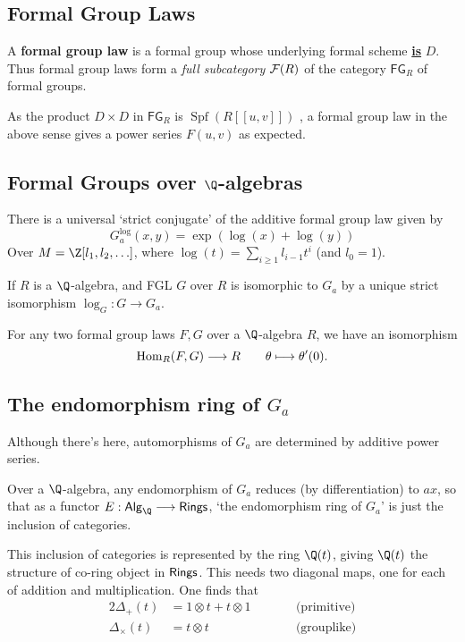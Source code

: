 \documentclass[11pt]{article}
\newcommand{\FGR}{\mathsf{FG}_R}
\newcommand{\FGLR}{\calF(R)}
\DeclareMathOperator{\SPf}{Spf}
\begin{document}
\subsection{Formal Group Laws}
\begin{itemise}
\setlength{\parindent}{.25in}
\item A \textbf{formal group law} is a formal group whose underlying formal scheme \textbf{\underline{is}} $D$. Thus formal group laws form a \emph{full subcategory} $\FGLR$ of the category $\FGR$ of formal groups.
\item As the product $D\times D$ in $\FGR$ is $\SPf(R[[u,v]])$ , a formal group law in the above sense gives a power series $F(u,v)$ as expected.
\end{itemise}
\subsection{Formal Groups over $\Q$-algebras}
\begin{itemise}
\setlength{\parindent}{.25in}
\item There is a universal `strict conjugate' of the additive formal group law given by
\[G_a^{\log}(x,y)=\exp(\log(x)+\log(y))\]
Over $M=\Z[l_1,l_2,\ldots]$, where $\log(t)=\sum_{i\geq1}l_{i-1}t^i$ (and $l_0=1$).
\item If $R$ is a $\Q$-algebra, and FGL $G$ over $R$ is isomorphic to $G_a$ by a unique strict isomorphism $\log_G:G\to G_a$.
\item For any two formal group laws $F,G$ over a $\Q$-algebra $R$, we have an isomorphism
\[\operatorname{Hom}_R(F,G)\longrightarrow R\qquad \theta\longmapsto\theta'(0).\]
\end{itemise}
\subsection{The endomorphism ring of $G_a$}
\begin{itemise}
\setlength{\parindent}{.25in}
\item Although there's   here, automorphisms of $G_a$ are determined by additive power series.
\item Over a $\Q$-algebra, any endomorphism of $G_a$ reduces (by differentiation) to $ax$, so that as a functor $E:\mathsf{Alg}_\Q\to\Rings$, `the endomorphism ring of $G_a$' is just the inclusion of categories.
\item This inclusion of categories is represented by the ring $\Q(t)$, giving $\Q(t)$ the structure of co-ring object in $\operatorname{{\mathsf{Rings}}}$. This needs two diagonal maps, one for each of addition and multiplication. One finds that
\begin{alignat*}{2}
\Delta_+(t)
&=
1\otimes t+t\otimes 1%
&\qquad&\text{(primitive)}\\
\Delta_\times (t)
&=
t\otimes t%
&\qquad&\text{(grouplike)}
\end{alignat*}

\end{itemise}
\end{document}
